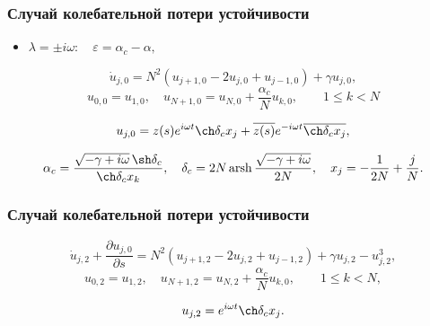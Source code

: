 \documentclass[fullscreen=true, unicode, bookmarks=false]{beamer}
\DeclareMathOperator{\arsh}{arsh}
\begin{document}
\begin{frame}
\frametitle{ Случай колебательной потери устойчивости }

\begin{itemize}
\item { $ \lambda = \pm i \omega: \quad \varepsilon=\alpha_c-\alpha, $
}
\end{itemize}

\bigskip
\pause

\begin{equation}
	\dot u_{j,0} = N^2(u_{j+1,0} - 2u_{j,0} + u_{j-1,0}) + \gamma u_{j,0},
\end{equation}
\begin{equation}
	u_{0,0} = u_{1,0}, \quad u_{N+1,0} = u_{N,0} + \dfrac{\alpha_c}{N}u_{k,0}, \qquad 1 \le k < N
\end{equation}

\bigskip

$$ u_{j,0} = z(s) e^{i \omega t} \ch \delta_c x_j + \overline{z(s)} e^{-i \omega t} \overline{\ch \delta_c x_j}, $$

\bigskip

$$ \alpha_c = \frac{ \sqrt{-\gamma + i \omega} \, \sh \delta_c }{ \ch\delta_c x_k }, \quad \delta_c = 2N \arsh \dfrac{\sqrt{-\gamma + i \omega}}{2N}, \quad x_j = -\dfrac{1}{2N} + \dfrac{j}{N}. $$

\end{frame}

\begin{frame}
\frametitle{ Случай колебательной потери устойчивости }

\begin{equation}
	\dot u_{j,2} + \frac{\partial u_{j,0}}{\partial s} = N^2(u_{j+1,2} - 2u_{j,2} + u_{j-1,2}) + \gamma u_{j,2} - u_{j,2}^3,
\end{equation}
\begin{equation}
	u_{0,2} = u_{1,2}, \quad u_{N+1,2} = u_{N,2} + \dfrac{\alpha_c}{N}u_{k,0}, \qquad 1 \le k < N,
\end{equation}

\bigskip

$$ u_{j,2} = e^{i \omega t} \ch \delta_c x_j. $$

\end{frame}
\end{document}
